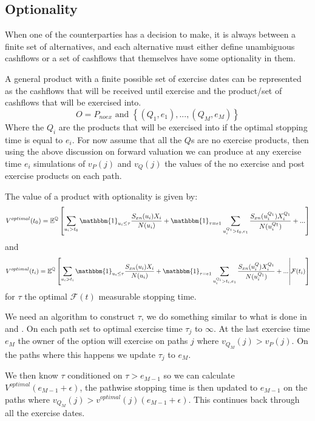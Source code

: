 \documentclass[a4paper,10pt]{article}
\newcommand{\E}{\mathbb{E}}                 %
\newcommand{\Q}{\mathbb{Q}}                 %
\begin{document}
\subsection{Optionality}
When one of the counterparties has a decision to make, it is always between a finite set of alternatives, and each alternative must either define unambiguous cashflows or a set of cashflows that themselves have some optionality in them.

A general product with a finite possible set of exercise dates can be represented as the cashflows that will be received until exercise and the product/set of cashflows that will be exercised into.
\begin{equation}
O = P_{noex} \text{ and } \left\{ \left(Q_1, e_1\right), ..., \left(Q_M, e_M\right) \right\}
\end{equation}
Where the $Q_i$ are the products that will be exercised into if the optimal stopping time is equal to $e_i$.  For now assume that all the $Q$s are no exercise products, then using the above discussion on forward valuation we can produce at any exercise time $e_i$ simulations of $v_P(j)$ and $v_Q(j)$ the values of the no exercise and post exercise products on each path.

The value of a product with optionality is given by:
\begin{equation}
V^{optimal}(t_0) = \E^\Q\left[ \sum_{u_i>t_0}\mathbbm{1}_{u_i\leq\tau}{\frac{S_{xn}(u_i)X_i}{N(u_i)}}  + 
\mathbbm{1}_{\tau=e1}\sum_{u_i^{Q_1}>t_0, e_1}{\frac{S_{xn}(u_i^{Q_1})X^{Q_1}_i}{N(u^{Q_1}_i)}} + ...
\right]
\end{equation}
and 
\begin{equation}
V^{optimal}(t_i) = \E^\Q\left[ \sum_{u_i>t_i}\mathbbm{1}_{u_i\leq\tau}{\frac{S_{xn}(u_i)X_i}{N(u_i)}}  + 
\mathbbm{1}_{\tau=e1}\sum_{u_i^{Q_i}>t_i,e_1}{\frac{S_{xn}(u_i^Q)X^{Q_1}_i}{N(u^{Q_1}_i)}} + ...
\middle| \mathcal{F}(t_i)\right]
\label{eq:fwdvalue2}
\end{equation}
for $\tau$ the optimal $\mathcal{F}(t)$ measurable stopping time.

We need an algorithm to construct $\tau$, we do something similar to what is done in \cite{cesari2010modelling} and \cite{AntonovEtAl2015}.  On each path set to optimal exercise time $\tau_j$ to $\infty$.  At the last exercise time $e_M$ the owner of the option will exercise on paths $j$ where $v_{Q_M}(j)>v_P(j)$.  On the paths where this happens we update $\tau_j$ to $e_M$.

We then know $\tau$ conditioned on $\tau>e_{M-1}$ so we can calculate $V^{optimal}(e_{M-1}+\epsilon)$, the pathwise stopping time is then updated to $e_{M-1}$ on the paths where $v_{Q_M}(j) > v^{optimal}(j)(e_{M-1}+\epsilon)$.  This continues back through all the exercise dates.
\end{document}
